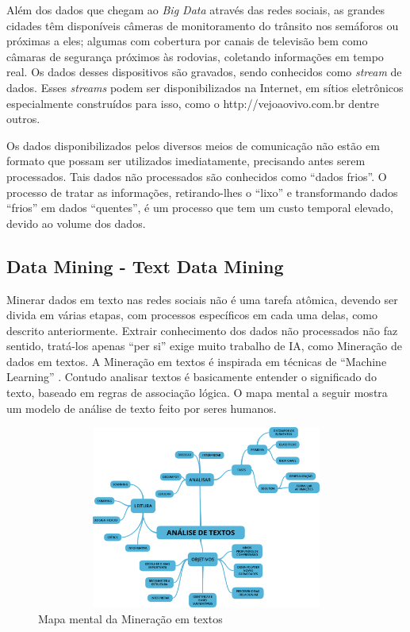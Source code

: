 Além dos dados que chegam ao \textit{Big Data} através das redes sociais, as grandes cidades têm disponíveis câmeras de monitoramento do trânsito nos semáforos ou próximas a eles; 
algumas com cobertura por canais de televisão bem como câmaras de segurança próximos às rodovias, coletando informações em tempo real. 
Os dados desses dispositivos são gravados, sendo conhecidos como \textit{stream} de dados. 
Esses \textit{streams} podem ser disponibilizados na Internet, em sítios eletrônicos especialmente construídos para isso, como o http://vejoaovivo.com.br dentre outros.

Os dados disponibilizados pelos diversos meios de comunicação não estão em formato que possam ser utilizados imediatamente, precisando antes serem processados. 
Tais dados não processados são conhecidos como ``dados frios''. O processo de tratar as informações, retirando-lhes o ``lixo'' e transformando dados ``frios'' em dados 
``quentes'', é um processo que tem um custo temporal elevado, devido ao volume dos dados.



\pagebreak
\subsection{Data Mining - Text Data Mining}\label{arte:palavraChave:DataMiningBigData}

Minerar dados em texto nas redes sociais não é uma tarefa atômica, devendo ser divida em várias etapas, com processos específicos em cada uma delas, como descrito anteriormente. 
Extrair conhecimento dos dados não processados não faz sentido, tratá-los apenas ``per si'' exige muito trabalho de IA, como Mineração de dados em textos. 
A Mineração em textos é inspirada em técnicas de ``Machine Learning'' \cite{Aranha2006}. 
Contudo analisar textos é basicamente entender o significado do texto, baseado em regras de associação lógica.
O mapa mental a seguir mostra um modelo de análise de texto feito por seres humanos.

\begin{figure}[htpb]
\centering
\caption{Mapa mental da Mineração em textos}
\includegraphics[width=120mm, height=60mm]{Figuras/BigData/Analise_Textos.png}
\end{figure}

